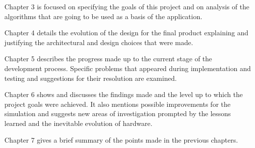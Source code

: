 \documentclass[main.tex]{subfiles}
\begin{document}
Chapter 3 is focused on specifying the goals of this project and on analysis of the algorithms that are going to be used as a basis of the application.

Chapter 4 details the evolution of the design for the final product explaining and justifying the architectural and design choices that were made.

Chapter 5 describes the progress made up to the current stage of the development process. Specific problems that appeared during implementation and testing and suggestions for their resolution are examined.

Chapter 6 shows and discusses the findings made and the level up to which the project goals were achieved. It also mentions possible improvements for the simulation and suggests new areas of investigation prompted by the lessons learned and the inevitable evolution of hardware.

Chapter 7 gives a brief summary of the points made in the previous chapters.

\end{document}
